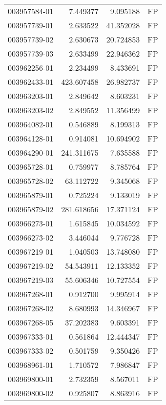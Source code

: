 \begin{tabular}{lrrl}
003957584-01 &    7.449377 &       9.095188 &   FP \\
003957739-01 &    2.633522 &      41.352028 &   FP \\
003957739-02 &    2.630673 &      20.724853 &   FP \\
003957739-03 &    2.633499 &      22.946362 &   FP \\
003962256-01 &    2.234499 &       8.433691 &   FP \\
003962433-01 &  423.607458 &      26.982737 &   FP \\
003963203-01 &    2.849642 &       8.603231 &   FP \\
003963203-02 &    2.849552 &      11.356499 &   FP \\
003964082-01 &    0.546889 &       8.199313 &   FP \\
003964128-01 &    0.914081 &      10.694902 &   FP \\
003964290-01 &  241.311675 &       7.635588 &   FP \\
003965728-01 &    0.759977 &       8.785764 &   FP \\
003965728-02 &   63.112722 &       9.345068 &   FP \\
003965879-01 &    0.725224 &       9.133019 &   FP \\
003965879-02 &  281.618656 &      17.371124 &   FP \\
003966273-01 &    1.615845 &      10.034592 &   FP \\
003966273-02 &    3.446044 &       9.776728 &   FP \\
003967219-01 &    1.040503 &      13.748080 &   FP \\
003967219-02 &   54.543911 &      12.133352 &   FP \\
003967219-03 &   55.606346 &      10.727554 &   FP \\
003967268-01 &    0.912700 &       9.995914 &   FP \\
003967268-02 &    8.680993 &      14.346967 &   FP \\
003967268-05 &   37.202383 &       9.603391 &   FP \\
003967333-01 &    0.561864 &      12.444347 &   FP \\
003967333-02 &    0.501759 &       9.350426 &   FP \\
003968961-01 &    1.710572 &       7.986847 &   FP \\
003969800-01 &    2.732359 &       8.567011 &   FP \\
003969800-02 &    0.925807 &       8.863916 &   FP \\

\end{tabular}
